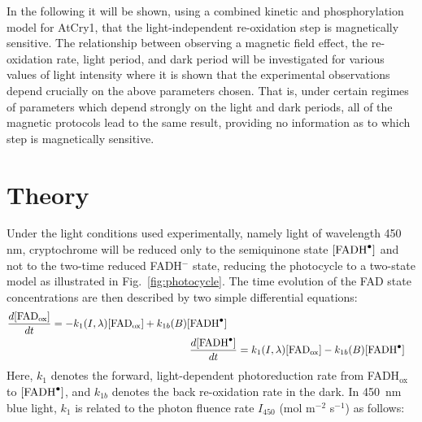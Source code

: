 \documentclass[twoside,twocolumn,9pt]{article}
\begin{document}
In the following it will be shown, using a combined kinetic and phosphorylation model for AtCry1, that the light-independent
re-oxidation step is magnetically sensitive. The relationship between observing a magnetic field effect, the re-oxidation rate,
light period, and dark period will be investigated for various values of light intensity where it is shown that the experimental
observations depend crucially on the above parameters chosen. That is, under certain regimes of parameters which depend strongly on
the light and dark periods, all of the magnetic protocols lead to the same result, providing no information as to which step is
magnetically sensitive.

\section{Theory}
Under the light conditions used experimentally, namely light of wavelength 450 nm, \cite{Pooam2019, Hammad2019} cryptochrome will be
reduced only to the semiquinone state $[\ce{FADH^{.}}]$ and not to the two-time reduced FADH$^-$ state, reducing the photocycle to a
two-state model \cite{Procopio2016} as illustrated in Fig.~\ref{fig:photocycle}. The time evolution of the FAD state concentrations
are then described by two simple differential equations:
\begin{subequations} \label{eq:ODE}
	\begin{align}
		\begin{split}
			\frac{d[\text{FAD}_{\text{ox}}]}{dt} & = -k_{1}(I, \lambda) [\text{FAD}_{\text{ox}}] + k_{1b}(B) [\ce{FADH^{.}}]
		\end{split}
	\\
		\frac{d[\ce{FADH^{.}}]}{dt} & = k_{1}(I, \lambda) [\text{FAD}_{\text{ox}}] - k_{1b}(B) [\ce{FADH^{.}}]
	\end{align}
\end{subequations}
Here, $k_{1}$ denotes the forward, light-dependent photoreduction rate from FADH$_{\text{ox}}$ to $[\ce{FADH^{.}}]$, and $k_{1b}$
denotes the back re-oxidation rate in the dark. In 450~nm blue light, $k_{1}$ is related to the photon fluence rate $I_{450}$ (mol
m$^{-2}$ s$^{-1}$) as follows: \cite{Kendrick94}
\end{document}
